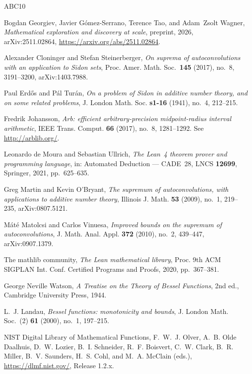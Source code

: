 \documentclass[11pt, letterpaper]{article}
\theoremstyle{paperplain}
\theoremstyle{paperdef}
\begin{document}

\begin{thebibliography}{ABC10}

Bogdan Georgiev, Javier G\'omez-Serrano, Terence Tao, and Adam~Zsolt
Wagner, \emph{Mathematical exploration and discovery at scale},
preprint, 2026, arXiv:2511.02864,
\url{https://arxiv.org/abs/2511.02864}.

Alexander Cloninger and Stefan Steinerberger, \emph{On suprema of
autoconvolutions with an application to Sidon sets}, Proc. Amer. Math.
Soc.\ \textbf{145} (2017), no.~8, 3191--3200, arXiv:1403.7988.

Paul Erd\H{o}s and P\'al Tur\'an, \emph{On a problem of Sidon in additive
number theory, and on some related problems}, J. London Math. Soc.
\textbf{s1-16} (1941), no.~4, 212--215.

Fredrik Johansson, \emph{Arb: efficient arbitrary-precision midpoint-radius
interval arithmetic}, IEEE Trans. Comput. \textbf{66} (2017), no.~8,
1281--1292.  See \url{http://arblib.org/}.

Leonardo de Moura and Sebastian Ullrich, \emph{The Lean~4 theorem prover
and programming language}, in: Automated Deduction --- CADE~28, LNCS
\textbf{12699}, Springer, 2021, pp.~625--635.

Greg Martin and Kevin O'Bryant, \emph{The supremum of autoconvolutions,
with applications to additive number theory}, Illinois J. Math.
\textbf{53} (2009), no.~1, 219--235, arXiv:0807.5121.

M\'at\'e Matolcsi and Carlos Vinuesa, \emph{Improved bounds on the supremum
of autoconvolutions}, J. Math. Anal. Appl. \textbf{372} (2010), no.~2,
439--447, arXiv:0907.1379.

The mathlib community, \emph{The Lean mathematical library}, Proc.
9th ACM SIGPLAN Int. Conf. Certified Programs and Proofs, 2020,
pp.~367--381.

George Neville Watson, \emph{A Treatise on the Theory of Bessel
Functions}, 2nd ed., Cambridge University Press, 1944.

L.~J. Landau, \emph{Bessel functions: monotonicity and bounds},
J. London Math. Soc.\ (2) \textbf{61} (2000), no.~1, 197--215.

NIST Digital Library of Mathematical Functions,
F.~W.~J. Olver, A.~B. Olde Daalhuis, D.~W. Lozier, B.~I. Schneider,
R.~F. Boisvert, C.~W. Clark, B.~R. Miller, B.~V. Saunders, H.~S. Cohl,
and M.~A. McClain (eds.), \url{https://dlmf.nist.gov/}, Release 1.2.x.

\end{thebibliography}
\end{document}
